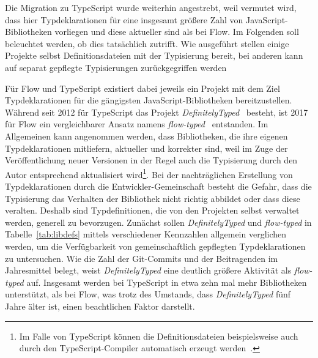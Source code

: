 Die Migration zu TypeScript wurde weiterhin angestrebt, weil vermutet wird, dass hier Typdeklarationen für eine insgesamt größere Zahl von JavaScript-Bibliotheken vorliegen und diese aktueller sind als bei Flow. Im Folgenden soll beleuchtet werden, ob dies tatsächlich zutrifft. Wie ausgeführt stellen einige Projekte selbst Definitionsdateien mit der Typisierung bereit, bei anderen kann auf separat gepflegte Typisierungen zurückgegriffen werden

Für Flow und TypeScript existiert dabei jeweils ein Projekt mit dem Ziel Typdeklarationen für die gängigsten JavaScript-Bibliotheken bereitzustellen. Während seit 2012 für TypeScript das Projekt \textit{DefinitelyTyped}~\autocite{DEFINITELY_TYPED} besteht, ist 2017 für Flow ein vergleichbarer Ansatz namens \textit{flow-typed}~\autocite{FLOW_TYPED} entstanden. Im Allgemeinen kann angenommen werden, dass Bibliotheken, die ihre eigenen Typdeklarationen mitliefern, aktueller und korrekter sind, weil im Zuge der Veröffentlichung neuer Versionen in der Regel auch die Typisierung durch den Autor entsprechend aktualisiert wird\footnote{Im Falle von TypeScript können die Definitionsdateien beispielsweise auch durch den TypeScript-Compiler automatisch erzeugt werden~\autocite{TSC:OPTIONS}.}. Bei der nachträglichen Erstellung von Typdeklarationen durch die Entwickler-Gemeinschaft besteht die Gefahr, dass die Typisierung das Verhalten der Bibliothek nicht richtig abbildet oder dass diese veralten. Deshalb sind Typdefinitionen, die von den Projekten selbst verwaltet werden, generell zu bevorzugen. Zunächst sollen \textit{DefinitelyTyped} und \textit{flow-typed} in Tabelle~\ref{tab:libdefs} mittels verschiedener Kennzahlen allgemein verglichen werden, um die Verfügbarkeit von gemeinschaftlich gepflegten Typdeklarationen zu untersuchen. Wie die Zahl der Git-Commits und der Beitragenden im Jahresmittel belegt, weist \textit{DefinitelyTyped} eine deutlich größere Aktivität als \textit{flow-typed} auf. Insgesamt werden bei TypeScript in etwa zehn mal mehr Bibliotheken unterstützt, als bei Flow, was trotz des Umstands, dass \textit{DefinitelyTyped} fünf Jahre älter ist, einen beachtlichen Faktor darstellt.

\medbreak


